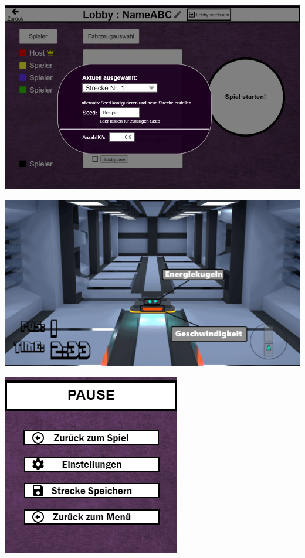 \documentclass[parskip=full]{scrartcl}
\begin{document}
\begin{center}
    	\includegraphics[width=\linewidth]{./Bilder/spielinterne_einstellungen.png}
		   \label{fig:Spielinterne_einstellungen}

		\includegraphics[width=\linewidth]{./Bilder/HudMockUp.png}
			\label{fig:HUD}

    	\includegraphics[width=.4\linewidth]{./Bilder/pausemenue.png}
  	 	\label{fig:Pausemenue}
  	 	

\end{center}
\end{document}
